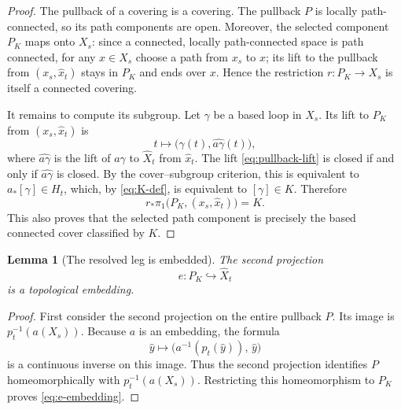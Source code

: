 \documentclass[11pt,reqno]{amsart}
\newtheorem{lemma}[theorem]{Lemma}
\theoremstyle{definition}
\theoremstyle{remark}
\begin{document}
\begin{proof}
The pullback of a covering is a covering.  The pullback \( P \) is locally path-connected, so its path components are open.  Moreover, the selected component \( P_K \) maps onto \( X_s \): since a connected, locally path-connected space is path connected, for any \( x\in X_s \) choose a path from \( x_s \) to \( x \); its lift to the pullback from \( (x_s,\widehat x_t) \) stays in \( P_K \) and ends over \( x \).  Hence the restriction \( r\colon P_K\to X_s \) is itself a connected covering.

It remains to compute its subgroup.  Let \( \gamma \) be a based loop in \( X_s \).  Its lift to \( P_K \) from \( (x_s,\widehat x_t) \) is
\begin{equation}\label{eq:pullback-lift}
  t\longmapsto\bigl(\gamma(t),\widehat{a\gamma}(t)\bigr),
\end{equation}
where \( \widehat{a\gamma} \) is the lift of \( a\gamma \) to \( \widehat X_t \) from \( \widehat x_t \).  The lift \eqref{eq:pullback-lift} is closed if and only if \( \widehat{a\gamma} \) is closed.  By the cover--subgroup criterion, this is equivalent to \( a_*[\gamma]\in H_t \), which, by \eqref{eq:K-def}, is equivalent to \( [\gamma]\in K \).  Therefore
\[
  r_*\pi_1\bigl(P_K,(x_s,\widehat x_t)\bigr)=K .
\]
This also proves that the selected path component is precisely the based connected cover classified by \( K \).
\end{proof}
\begin{lemma}[The resolved leg is embedded]\label{lem:embedded-leg}
The second projection
\begin{equation}\label{eq:e-embedding}
  e\colon P_K\hookrightarrow\widehat X_t
\end{equation}
is a topological embedding.
\end{lemma}

\begin{proof}
First consider the second projection on the entire pullback \( P \).  Its image is \( p_t^{-1}(a(X_s)) \).  Because \( a \) is an embedding, the formula
\begin{equation}\label{eq:e-inverse}
  \widehat y\longmapsto\bigl(a^{-1}(p_t(\widehat y)),\,\widehat y\bigr)
\end{equation}
is a continuous inverse on this image.  Thus the second projection identifies \( P \) homeomorphically with \( p_t^{-1}(a(X_s)) \).  Restricting this homeomorphism to \( P_K \) proves \eqref{eq:e-embedding}.
\end{proof}
\end{document}
